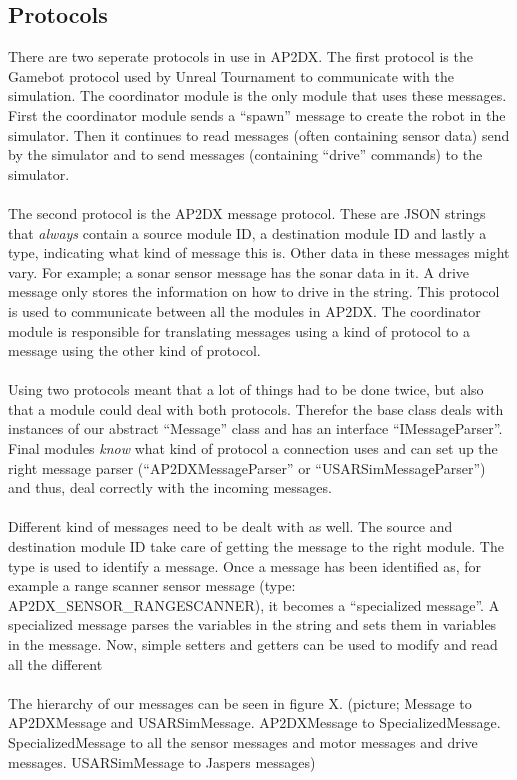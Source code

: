 \subsection{Protocols}
There are two seperate protocols in use in AP2DX. The first protocol is the Gamebot protocol 
used by Unreal Tournament to communicate with the simulation. The coordinator module is the 
only module that uses these messages. First the coordinator module sends a ``spawn'' message 
to create the robot in the simulator. Then it continues to read messages (often containing 
sensor data) send by the simulator and to send messages (containing ``drive'' commands) to
the simulator. 
\\\\
The second protocol is the AP2DX message protocol. These are JSON strings that \emph{always}
contain a source module ID, a destination module ID and lastly a type, indicating what kind
of message this is. Other data in these messages might vary. For example; a sonar sensor
message has the sonar data in it. A drive message only stores the information on how to drive
in the string. 
This protocol is used to communicate between all the modules in 
AP2DX.  The coordinator module is responsible for translating messages using a kind of
protocol to a message using the other kind of protocol.
\\\\
Using two protocols meant that a lot of things had to be done twice, but also that a module 
could deal with both protocols. Therefor the 
base class deals with instances
of our abstract ``Message'' class and has an interface ``IMessageParser''. Final modules \emph{know}
what kind of protocol a connection uses and can set up the right message parser (``AP2DXMessageParser'' 
or ``USARSimMessageParser'') and thus, deal correctly with the incoming messages. 
\\\\
Different kind of messages need to be dealt with as well. The source and destination module ID take care
of getting the message to the right module. The type is used to identify a message. Once a message
has been identified as, for example a range scanner sensor message (type: AP2DX\_SENSOR\_RANGESCANNER), 
it becomes a ``specialized message''. 
A specialized message parses the variables in the string and sets them in variables in the message. Now,
simple setters and getters can be used to modify and read all the different 
\\\\
The hierarchy of our messages can be seen in figure X. 
(picture; Message to AP2DXMessage and USARSimMessage. AP2DXMessage to SpecializedMessage. SpecializedMessage
to all the sensor messages and motor messages and drive messages. USARSimMessage to Jaspers messages) 

